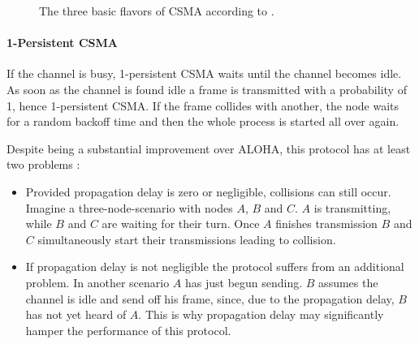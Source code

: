 \begin{figure}[tb] \label{fig:csma-flavors}
	\begin{center}
		\qquad
		\qquad
	\end{center}
\caption[The three basic flavors of CSMA.]{The three basic flavors of CSMA according to \cite{Tanenbaum02}.}
\end{figure}


\paragraph{1-Persistent CSMA}
\label{sec:csma-1-persistent}

If the channel is busy, 1-persistent CSMA waits until the channel becomes idle. As soon as the channel is found idle a frame is transmitted with a probability of 1, hence 1-persistent CSMA. If the frame collides with another, the node waits for a random backoff time and then the whole process is started all over again.

Despite being a substantial improvement over ALOHA, this protocol has at least two problems \cite{Tanenbaum02}:

\begin{itemize}
	\item Provided propagation delay is zero or negligible, collisions can still occur.  Imagine a three-node-scenario with nodes $A$, $B$ and $C$. $A$ is transmitting, while $B$ and $C$ are waiting for their turn. Once $A$ finishes transmission $B$ and $C$ simultaneously start their transmissions leading to collision.
	
	\item If propagation delay is not negligible the protocol suffers from an additional problem. In another scenario $A$ has just begun sending. $B$ assumes the channel is idle and send off his frame, since, due to the propagation delay, $B$ has not yet heard of $A$. This is why propagation delay may significantly hamper the performance of this protocol.
\end{itemize}  

